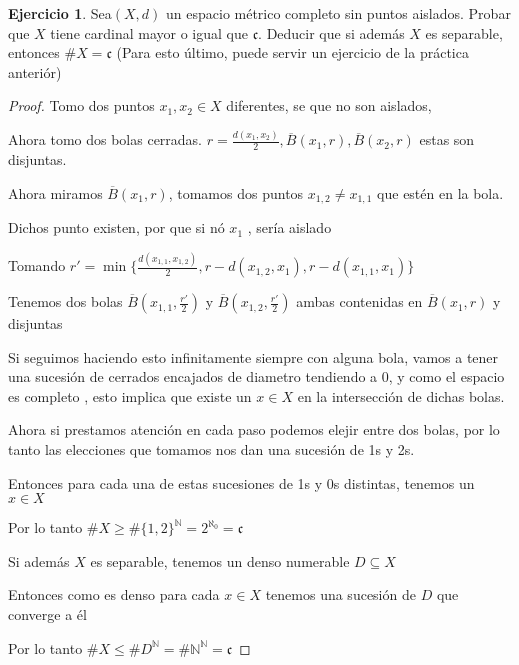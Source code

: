 \documentclass[11pt]{report}
\newcommand{\n}{\aleph_{0}}
\newcommand{\N}{\mathbb{N}}
\newcommand{\ol}{\overline}
\theoremstyle{definition}
\newtheorem{ej}{Ejercicio}
\begin{document}
	\begin{ej}
		Sea$(X,d)$ un espacio métrico completo sin puntos aislados. Probar que $X$ tiene cardinal mayor o igual que $\mathfrak{c}$. Deducir que si además $X$ es separable, entonces $\# X = \mathfrak{c}$ (Para esto último, puede servir un ejercicio de la práctica anteriór)

		\begin{proof}
			Tomo dos puntos $x_1,x_2 \in X$ diferentes, se que no son aislados, 

			Ahora tomo dos bolas cerradas. $r = \frac{d(x_1,x_2)}{2},  \ol B(x_1,r), \ol B(x_2,r)$ estas son disjuntas.

			Ahora miramos $\ol B(x_1,r)$, tomamos dos puntos $x_{1,2} \neq x_{1,1}$ que estén en la bola. 

			Dichos punto existen, por que si nó $x_1$ , sería aislado

			Tomando $r' = \min\{\frac{d(x_{1,1},x_{1,2})}{2},r - d(x_{1,2},x_1), r-d(x_{1,1},x_1)\}$

			Tenemos dos bolas $\ol B(x_{1,1},\frac{r'}{2})$ y $\ol B(x_{1,2},\frac{r'}{2})$ ambas contenidas en $\ol B(x_1,r)$ y disjuntas

			Si seguimos haciendo esto infinitamente siempre con alguna bola, vamos a tener una sucesión de cerrados encajados de diametro tendiendo a 0, y como el espacio es completo , esto implica que existe un $x \in X$ en la intersección de dichas bolas.

			Ahora si prestamos atención en cada paso podemos elejir entre dos bolas, por lo tanto las elecciones que tomamos nos dan una sucesión de 1s y 2s. 

			Entonces para cada una de estas sucesiones de 1s y 0s distintas, tenemos un $x \in X$

			Por lo tanto $\# X \geq \# \{1,2\}^{\N} = 2^{\n} = \mathfrak{c}$

			Si además $X$ es separable, tenemos un denso numerable $D \subseteq X$

			Entonces como es denso para cada $x \in X$ tenemos una sucesión de $D$ que converge a él

			Por lo tanto $\# X \leq \# D^{\N} = \# \N^{\N} = \mathfrak{c}$
		\end{proof}
		
	\end{ej}
\end{document}
